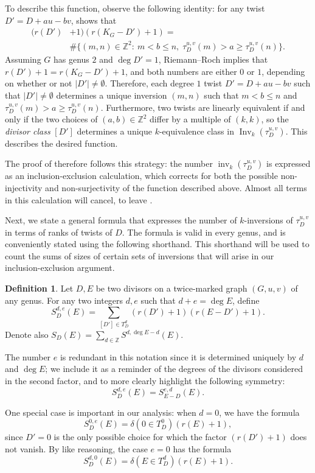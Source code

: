 \documentclass[11pt]{article}
\theoremstyle{definition}
\newtheorem{defi}[theo]{Definition}
\numberwithin{equation}{section}
\newcommand{\Z}{\mathbb{Z}}
\newcommand{\Inv}{\operatorname{Inv}}
\newcommand{\inv}{\operatorname{inv}}
\newcommand{\tauD}{\tau^{u,v}_D}
\begin{document}
To describe this function, observe the following identity: for any twist $D' = D + au-bv$,  shows that
\begin{align*}
( r(D') &+ 1 ) ( r(K_G-D') + 1 ) =\\
&\# \{ (m,n) \in \Z^2:\ m < b \leq n,\;\tauD(m) > a \geq \tauD(n) \}.
\end{align*}
Assuming $G$ has genus $2$ and $\deg D' = 1$, Riemann--Roch implies that $r(D') +1= r(K_G-D')+1$, and both numbers are either $0$ or $1$, depending on whether or not $|D'| \neq \emptyset$. Therefore, each degree $1$ twist $D' = D + au-bv$ such that $|D'| \neq \emptyset$ determines a unique inversion $(m,n)$ such that $m < b \leq n$ and $\tauD(m) > a \geq \tauD(n)$. Furthermore, two twists are linearly equivalent if and only if the two choices of $(a,b) \in \Z^2$ differ by a multiple of $(k,k)$, so the \emph{divisor class} $[D']$ determines a unique $k$-equivalence class in $\Inv_k(\tauD)$. This describes the desired function.

The proof of  therefore follows this strategy: the number $\inv_k(\tauD)$ is expressed as an inclusion-exclusion calculation, which corrects for both the possible non-injectivity and non-surjectivity of the function described above. Almost all terms in this calculation will cancel, to leave .

Next, we state a general formula that expresses the number of $k$-inversions of $\tauD$ in terms of ranks of twists of $D$. The formula is valid in every genus, and is conveniently stated using the following shorthand. This shorthand will be used to count the sums of sizes of certain sets of inversions that will arise in our inclusion-exclusion argument.

\begin{defi}
Let $D,E$ be two divisors on a twice-marked graph $(G,u,v)$ of any genus. For any two integers $d,e$ such that $d+e = \deg E$, define 
$$S^{d,e}_D(E) = \sum_{[D'] \in T^d_D} \left( r(D') + 1 \right) \left( r(E-D') + 1\right).$$
Denote also $S_D(E) = \sum_{d \in \Z} S^{d,\deg E - d}(E)$.
\end{defi}

The number $e$ is redundant in this notation since it is determined uniquely by $d$ and $\deg E$; we include it as a reminder of the degrees of the divisors considered in the second factor, and to more clearly highlight the following symmetry:
$$S^{d,e}_D(E) = S^{e,d}_{E-D}(E).$$

One special case is important in our analysis: when $d=0$, we have the formula
\begin{equation}
\label{eq:S0e}
S^{0,e}_D(E) = \delta(0 \in T^0_D) \left( r(E) + 1 \right),
\end{equation}
since $D' = 0$ is the only possible choice for which the factor $(r(D')+1)$ does not vanish. By like reasoning, the case $e=0$ has the formula
\begin{equation}
\label{eq:Sd0}
S^{d,0}_D(E) = \delta(E \in T^d_D) \left( r(E) + 1 \right).
\end{equation}
\end{document}
